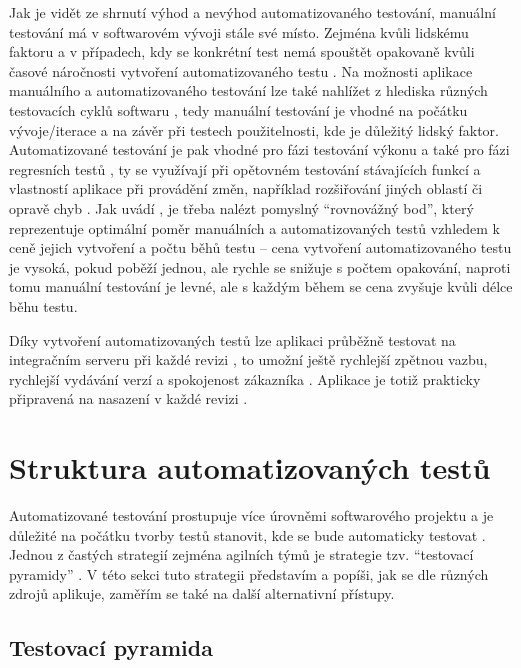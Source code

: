 Jak je vidět ze shrnutí výhod a nevýhod automatizovaného testování, manuální testování má v softwarovém vývoji stále své místo. Zejména kvůli lidskému faktoru a v případech, kdy se konkrétní test nemá spouštět opakovaně kvůli časové náročnosti vytvoření automatizovaného testu \cite{test-bdo}. Na možnosti aplikace manuálního a automatizovaného testování lze také nahlížet z hlediska různých testovacích cyklů softwaru \cite{test-bdo}, tedy manuální testování je vhodné na počátku vývoje/iterace a na závěr při testech použitelnosti, kde je důležitý lidský faktor. Automatizované testování je pak vhodné pro fázi testování výkonu a také pro fázi regresních testů \cite{test-bdo}, ty se využívají při opětovném testování stávajících funkcí a vlastností aplikace při provádění změn, například rozšiřování jiných oblastí či opravě chyb \cite{test-regresni}. Jak uvádí \cite{test-bdo}, je třeba nalézt pomyslný \enquote{rovnovážný bod}, který reprezentuje optimální poměr manuálních a automatizovaných testů vzhledem k ceně jejich vytvoření a počtu běhů testu -- cena vytvoření automatizovaného testu je vysoká, pokud poběží jednou, ale rychle se snižuje s počtem opakování, naproti tomu manuální testování je levné, ale s každým během se cena zvyšuje kvůli délce běhu testu.

Díky vytvoření automatizovaných testů lze aplikaci průběžně testovat na integračním serveru při každé revizi \cite{test-kitner}, to umožní ještě rychlejší zpětnou vazbu, rychlejší vydávání verzí a spokojenost zákazníka \cite{test-perfecto}. Aplikace je totiž prakticky připravená na nasazení v každé revizi \cite{test-atlassian}.

\section{Struktura automatizovaných testů}

Automatizované testování prostupuje více úrovněmi softwarového projektu \cite{test-kitner2} a je důležité na počátku tvorby testů stanovit, kde se bude automaticky testovat \cite{test-kitner}. Jednou z častých strategií zejména agilních týmů je strategie tzv. \enquote{testovací pyramidy} \cite{test-smartbear}. V této sekci tuto strategii představím a popíši, jak se dle různých zdrojů aplikuje, zaměřím se také na další alternativní přístupy.

\subsection{Testovací pyramida}

